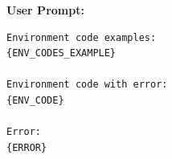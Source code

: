 \textbf{User Prompt:}
\begin{lstlisting}[language={}]
Environment code examples:
{ENV_CODES_EXAMPLE}

Environment code with error:
{ENV_CODE}

Error:
{ERROR}
\end{lstlisting}
